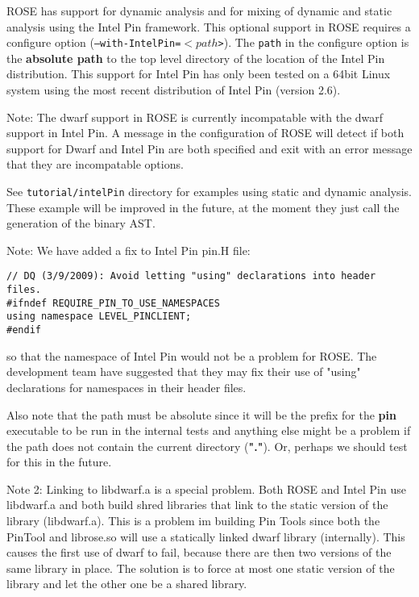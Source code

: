    ROSE has support for dynamic analysis and for mixing of dynamic
and static analysis using the Intel Pin framework. This optional support in ROSE
requires a configure option ({\tt --with-IntelPin=$<path$>}).  The {\tt path} in
the configure option is the {\bf absolute path} to the top level directory of the location of
the Intel Pin distribution.  This support for Intel Pin has only been tested
on a 64bit Linux system using the most recent distribution of Intel Pin (version 2.6).

Note: The dwarf support in ROSE is currently incompatable with the dwarf support in
Intel Pin.  A message in the configuration of ROSE will detect if both support for
Dwarf and Intel Pin are both specified and exit with an error message that they
are incompatable options.

See {\tt tutorial/intelPin} directory for examples using static and dynamic analysis.
These example will be improved in the future, at the moment they just call the
generation of the binary AST.


Note: We have added a fix to Intel Pin pin.H file:
\begin{verbatim}
// DQ (3/9/2009): Avoid letting "using" declarations into header files.
#ifndef REQUIRE_PIN_TO_USE_NAMESPACES
using namespace LEVEL_PINCLIENT;
#endif
\end{verbatim}
so that the namespace of Intel Pin would not be a problem for ROSE.
The development team have suggested that they may fix their use of "using" 
declarations for namespaces in their header files.

Also note that the path must be absolute since it will be the
prefix for the {\bf pin} executable to be run in the internal tests and
anything else might be a problem if the path does not contain the 
current directory ({\bf "."}). Or, perhaps we should test for this
in the future.

Note 2: Linking to libdwarf.a is a special problem.  
Both ROSE and Intel Pin use libdwarf.a and both build shred libraries 
that link to the static version of the library (libdwarf.a).  This is 
a problem im building Pin Tools since both the PinTool and librose.so will use 
a statically linked dwarf library (internally).  This causes the first
use of dwarf to fail, because there are then two versions of the same 
library in place.  The solution is to force at most one static version 
of the library and let the other one be a shared library.

